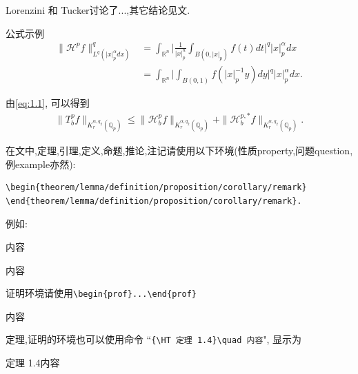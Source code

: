 \documentclass{amsc}          %
\numberwithin{equation}{section} %
\begin{document}


\EndTitle



 Lorenzini 和
Tucker\supercite{LT}讨论了...,其它结论见文\cite{HB,T1,T2}.

公式示例
\begin{align}\label{eq:1.1}
\|\mathcal{H}^pf\|^q_{L^q(|x|_p^{\alpha}dx)}&=\int_{\mathbb{R}^{n}}
\bigg|\frac{1}{|x|_p^{n}}\int_{B(0,|x|_p)}f(t)dt\bigg|^q|x|_p^{\alpha}dx\nonumber\\
&=\int_{\mathbb{R}^{n}}
\bigg|\int_{B(0,1)}f(|x|_p^{-1}y)dy\bigg|^q|x|_p^{\alpha}dx.
\end{align}


由\eqref{eq:1.1}, %
可以得到
\begin{align*}
\|T^p_{b}f\|_{K^{\alpha, q_2}_{r}(\mathbb{Q}_{p})}\leq
\|\mathcal{H}^p_{b}f\|_{K^{\alpha, q_2}_{r}(\mathbb{Q}_{p})}+
\|\mathcal{H}^{p,*}_{b}f\|_{K^{\alpha, q_2}_{r}(\mathbb{Q}_{p})}.
\end{align*}



在文中,定理,引理,定义,命题,推论,注记请使用以下环境(性质property,问题question,例example亦然):
\begin{verbatim}
\begin{theorem/lemma/definition/proposition/corollary/remark}
\end{theorem/lemma/definition/proposition/corollary/remark}.
\end{verbatim}

例如:
\begin{definition} 内容
\end{definition}


\begin{lemma} 内容
\end{lemma}

\begin{remark} 证明环境请使用\verb|\begin{prof}...\end{prof}|
\end{remark}




\begin{prof}内容\end{prof}

定理,证明的环境也可以使用命令 ``\verb|{\HT 定理 1.4}\quad 内容|",
显示为

{\HT 定理 1.4}\quad 内容
\end{document}
